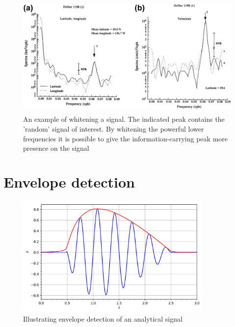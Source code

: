 \begin{figure}[h!t]
	\begin{center}
		\includegraphics[height=60mm]{images/prewhitening_example.jpg}
	\end{center}
	\caption{An example of whitening a signal. The indicated peak contains the 'random' signal of interest. By whitening the powerful lower frequencies it is possible to give the information-carrying peak more presence on the signal \cite{time_series_analysis_methods}}
	\label{fig:whitening_example}
\end{figure}


\section{Envelope detection}

\begin{figure}[h!t]
	\begin{center}
		\includegraphics[height=60mm]{images/envelope_wikipedia.png}
	\end{center}
	\caption{Illustrating envelope detection of an analytical signal \cite{envelope_wikipedia}}
	\label{fig:envelope_wikipedia}
\end{figure}

